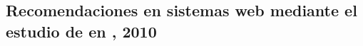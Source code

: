 %
%  
%  
%  
%  
%






\subsection*{Recomendaciones en sistemas web mediante el estudio de \irs en \transacciones, 2010}
\label{sec:nuestro-Recomendaciones-2010}

